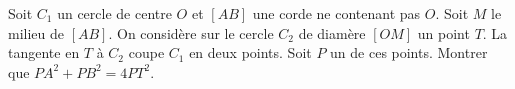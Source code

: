\documentclass[varwidth]{standalone}
\begin{document}
    Soit $C_1$ un cercle de centre $O$ et $[AB]$ une corde ne contenant pas $O$. Soit $M$ le milieu de $[AB]$. On consid\`ere sur le cercle $C_2$ de diam\`ere $[OM]$ un point $T$. La tangente en $T$ \`a $C_2$ coupe $C_1$ en deux points. Soit $P$ un de ces points. Montrer que $PA^2 + PB^2 = 4PT^2$.
\end{document}
